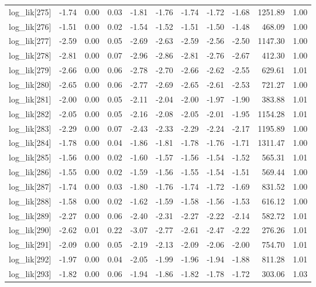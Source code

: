 \begin{table}[ht]
\begin{tabular}{rrrrrrrrrrr}
  log\_lik[275] & -1.74 & 0.00 & 0.03 & -1.81 & -1.76 & -1.74 & -1.72 & -1.68 & 1251.89 & 1.00 \\ 
  log\_lik[276] & -1.51 & 0.00 & 0.02 & -1.54 & -1.52 & -1.51 & -1.50 & -1.48 & 468.09 & 1.00 \\ 
  log\_lik[277] & -2.59 & 0.00 & 0.05 & -2.69 & -2.63 & -2.59 & -2.56 & -2.50 & 1147.30 & 1.00 \\ 
  log\_lik[278] & -2.81 & 0.00 & 0.07 & -2.96 & -2.86 & -2.81 & -2.76 & -2.67 & 412.30 & 1.00 \\ 
  log\_lik[279] & -2.66 & 0.00 & 0.06 & -2.78 & -2.70 & -2.66 & -2.62 & -2.55 & 629.61 & 1.01 \\ 
  log\_lik[280] & -2.65 & 0.00 & 0.06 & -2.77 & -2.69 & -2.65 & -2.61 & -2.53 & 721.27 & 1.00 \\ 
  log\_lik[281] & -2.00 & 0.00 & 0.05 & -2.11 & -2.04 & -2.00 & -1.97 & -1.90 & 383.88 & 1.01 \\ 
  log\_lik[282] & -2.05 & 0.00 & 0.05 & -2.16 & -2.08 & -2.05 & -2.01 & -1.95 & 1154.28 & 1.01 \\ 
  log\_lik[283] & -2.29 & 0.00 & 0.07 & -2.43 & -2.33 & -2.29 & -2.24 & -2.17 & 1195.89 & 1.00 \\ 
  log\_lik[284] & -1.78 & 0.00 & 0.04 & -1.86 & -1.81 & -1.78 & -1.76 & -1.71 & 1311.47 & 1.00 \\ 
  log\_lik[285] & -1.56 & 0.00 & 0.02 & -1.60 & -1.57 & -1.56 & -1.54 & -1.52 & 565.31 & 1.01 \\ 
  log\_lik[286] & -1.55 & 0.00 & 0.02 & -1.59 & -1.56 & -1.55 & -1.54 & -1.51 & 569.44 & 1.00 \\ 
  log\_lik[287] & -1.74 & 0.00 & 0.03 & -1.80 & -1.76 & -1.74 & -1.72 & -1.69 & 831.52 & 1.00 \\ 
  log\_lik[288] & -1.58 & 0.00 & 0.02 & -1.62 & -1.59 & -1.58 & -1.56 & -1.53 & 616.12 & 1.00 \\ 
  log\_lik[289] & -2.27 & 0.00 & 0.06 & -2.40 & -2.31 & -2.27 & -2.22 & -2.14 & 582.72 & 1.01 \\ 
  log\_lik[290] & -2.62 & 0.01 & 0.22 & -3.07 & -2.77 & -2.61 & -2.47 & -2.22 & 276.26 & 1.01 \\ 
  log\_lik[291] & -2.09 & 0.00 & 0.05 & -2.19 & -2.13 & -2.09 & -2.06 & -2.00 & 754.70 & 1.01 \\ 
  log\_lik[292] & -1.97 & 0.00 & 0.04 & -2.05 & -1.99 & -1.96 & -1.94 & -1.88 & 811.28 & 1.01 \\ 
  log\_lik[293] & -1.82 & 0.00 & 0.06 & -1.94 & -1.86 & -1.82 & -1.78 & -1.72 & 303.06 & 1.03 \\ 

\end{tabular}
\end{table}
